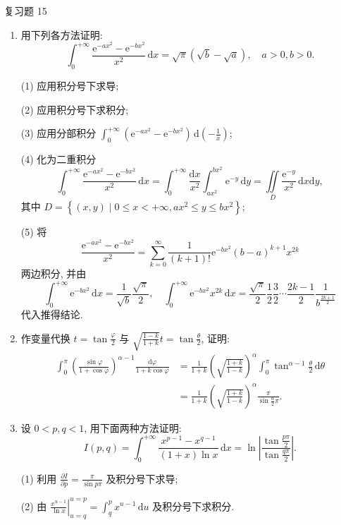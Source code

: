 \begin{exblock}{复习题 15}
\begin{enumerate}
  (3) 根据 (1) 与 (2) 给出 $\ln(1+\sqrt{1-x^{2}})$ 的 Maclaurin 展开式, 以及 $f^{(k)}(0)$, $k=0,1,2,\cdots$.

  \item 用下列各方法证明:
  \[
    \int_{0}^{+\infty}\frac{\mathrm{e}^{-ax^{2}}-\mathrm{e}^{-bx^{2}}}{x^{2}}\,\mathrm{d}x=\sqrt{\pi}(\sqrt{b}-\sqrt{a}),\quad a>0,b>0.
\]

  (1) 应用积分号下求导;

  (2) 应用积分号下求积分;

  (3) 应用分部积分 $\displaystyle\int_{0}^{+\infty}(\mathrm{e}^{-ax^{2}}-\mathrm{e}^{-bx^{2}})\,\mathrm{d}\left(-\frac{1}{x}\right)$;

  (4) 化为二重积分
  \[
    \int_{0}^{+\infty}\frac{\mathrm{e}^{-ax^{2}}-\mathrm{e}^{-bx^{2}}}{x^{2}}\,\mathrm{d}x=\int_{0}^{+\infty}\frac{\mathrm{d}x}{x^{2}}\int_{ax^{2}}^{bx^{2}}\mathrm{e}^{-y}\,\mathrm{d}y=\iint\limits_{D}\frac{\mathrm{e}^{-y}}{x^{2}}\,\mathrm{d}x\mathrm{d}y,
\]
  其中 $D=\left\{(x,y)\mid 0\leqslant x<+\infty, ax^{2}\leqslant y\leqslant bx^{2}\right\}$;

  (5) 将
  \[
    \frac{\mathrm{e}^{-ax^{2}}-\mathrm{e}^{-bx^{2}}}{x^{2}}=\sum_{k=0}^{\infty}\frac{1}{(k+1)!}\mathrm{e}^{-bx^{2}}(b-a)^{k+1}x^{2k}
\]
  两边积分, 并由
  \[
    \int_{0}^{+\infty}\mathrm{e}^{-bx^{2}}\,\mathrm{d}x=\frac{1}{\sqrt{b}}\frac{\sqrt{\pi}}{2},\quad\int_{0}^{+\infty}\mathrm{e}^{-bx^{2}}x^{2k}\,\mathrm{d}x=\frac{\sqrt{\pi}}{2}\frac{1}{2}\frac{3}{2}\cdots\frac{2k-1}{2}\frac{1}{b^{\frac{2k+1}{2}}}
\]
  代入推得结论.

  \item 作变量代换 $\displaystyle t=\tan\frac{\varphi}{2}$ 与 $\displaystyle\sqrt{\frac{1-k}{1+k}}t=\tan\frac{\theta}{2}$, 证明:
  \[
    \begin{aligned}
      \int_{0}^{\pi}\left(\frac{\sin\varphi}{1+\cos\varphi}\right)^{\alpha-1}\frac{\mathrm{d}\varphi}{1+k\cos\varphi}&=\frac{1}{1+k}\left(\sqrt{\frac{1+k}{1-k}}\right)^{\alpha}\int_{0}^{\pi}\tan^{\alpha-1}\frac{\theta}{2}\,\mathrm{d}\theta\\
      &=\frac{1}{1+k}\left(\sqrt{\frac{1+k}{1-k}}\right)^{\alpha}\frac{\pi}{\sin\frac{\alpha}{2}\pi}.
    \end{aligned}
\]

  \item 设 $0<p,q<1$, 用下面两种方法证明:
  \[
    I(p,q)=\int_{0}^{+\infty}\frac{x^{p-1}-x^{q-1}}{(1+x)\ln x}\,\mathrm{d}x=\ln\left|\frac{\tan\frac{p\pi}{2}}{\tan\frac{q\pi}{2}}\right|.
\]

  (1) 利用 $\displaystyle\frac{\partial I}{\partial p}=\frac{\pi}{\sin p\pi}$ 及积分号下求导;

  (2) 由 $\displaystyle\left.\frac{x^{u-1}}{\ln x}\right|_{u=q}^{u=p}=\int_{q}^{p}x^{u-1}\,\mathrm{d}u$ 及积分号下求积分.
\end{enumerate}
\end{exblock}
